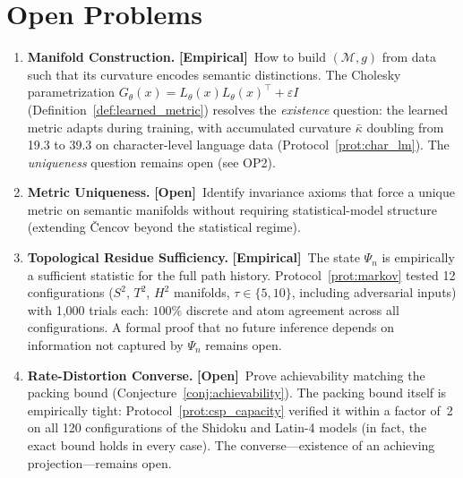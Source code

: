 \documentclass[11pt,a4paper]{article}
\theoremstyle{definition}
\theoremstyle{remark}
\newcommand{\Mman}{(\mathcal{M}, g)}
\newcommand{\statusopen}{\textcolor{red!70!black}{\textbf{[Open]}}}
\newcommand{\statusempirical}{\textcolor{purple!70!black}{\textbf{[Empirical]}}}
\begin{document}
\section{Open Problems}\label{sec:open}

\begin{enumerate}[label=\textbf{OP\arabic*.},leftmargin=2.5em]
    \item \textbf{Manifold Construction.} \statusempirical\ How to 
    build $\Mman$ from data such that its curvature encodes 
    semantic distinctions. The Cholesky parametrization 
    $G_\theta(x) = L_\theta(x) L_\theta(x)^\top + \varepsilon I$ 
    (Definition~\ref{def:learned_metric}) resolves the 
    \emph{existence} question: the learned metric adapts during 
    training, with accumulated curvature $\bar\kappa$ doubling 
    from 19.3 to 39.3 on character-level language data 
    (Protocol~\ref{prot:char_lm}). The \emph{uniqueness} 
    question remains open (see OP2).
    
    \item \textbf{Metric Uniqueness.} \statusopen\ Identify 
    invariance axioms that force a unique metric on semantic 
    manifolds without requiring statistical-model structure 
    (extending \v{C}encov beyond the statistical regime).
    
    \item \textbf{Topological Residue Sufficiency.} \statusempirical\ 
    The state $\Psi_n$ is empirically a sufficient statistic 
    for the full path history. Protocol~\ref{prot:markov} 
    tested 12 configurations ($S^2$, $T^2$, $H^2$ manifolds, 
    $\tau \in \{5, 10\}$, including adversarial inputs) with 
    1{,}000 trials each: $100\%$ discrete and atom agreement 
    across all configurations. A formal proof that no future 
    inference depends on information not captured by $\Psi_n$ 
    remains open.
    
    \item \textbf{Rate-Distortion Converse.} \statusopen\ Prove 
    achievability matching the packing bound 
    (Conjecture~\ref{conj:achievability}). The packing bound 
    itself is empirically tight: Protocol~\ref{prot:csp_capacity} 
    verified it within a factor of~2 on all 120 configurations of 
    the Shidoku and Latin-4 models (in fact, the exact bound 
    holds in every case). The converse---existence of an 
    achieving projection---remains open.
    

\end{enumerate}
\end{document}
